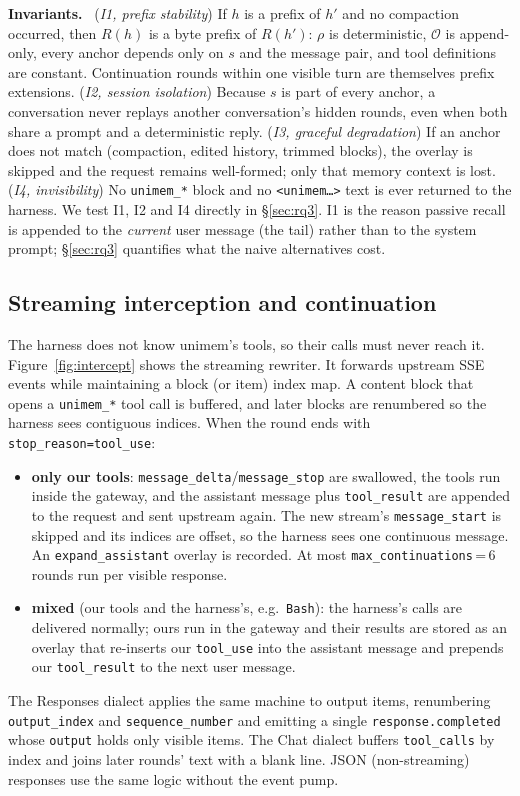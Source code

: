 \documentclass[10pt,twocolumn]{article}
\newcommand{\sys}{\textsf{unimem}}
\newcommand{\code}[1]{\texttt{\small #1}}
\newcommand{\para}[1]{\smallskip\noindent\textbf{#1}\ }
\begin{document}
\para{Invariants.}
(\emph{I1, prefix stability}) If $h$ is a prefix of $h'$ and no compaction occurred, then $R(h)$ is a byte prefix of
$R(h')$: $\rho$ is deterministic, $\mathcal{O}$ is append-only, every anchor depends only on $s$ and the message pair,
and tool definitions are constant. Continuation rounds within one visible turn are themselves prefix extensions.
(\emph{I2, session isolation}) Because $s$ is part of every anchor, a conversation never replays another
conversation's hidden rounds, even when both share a prompt and a deterministic reply.
(\emph{I3, graceful degradation}) If an anchor does not match (compaction, edited history, trimmed blocks), the overlay
is skipped and the request remains well-formed; only that memory context is lost.
(\emph{I4, invisibility}) No \code{unimem\_*} block and no \code{<unimem\ldots>} text is ever returned to the harness.
We test I1, I2 and I4 directly in \S\ref{sec:rq3}. I1 is the reason passive recall is appended to the \emph{current}
user message (the tail) rather than to the system prompt; \S\ref{sec:rq3} quantifies what the naive alternatives cost.

\subsection{Streaming interception and continuation}
\label{sec:intercept}

The harness does not know \sys{}'s tools, so their calls must never reach it. Figure~\ref{fig:intercept} shows the
streaming rewriter. It forwards upstream SSE events while maintaining a block (or item) index map. A content block
that opens a \code{unimem\_*} tool call is buffered, and later blocks are renumbered so the harness sees contiguous
indices. When the round ends with \code{stop\_reason=tool\_use}:
\begin{itemize}
\item \textbf{only our tools}: \code{message\_delta}/\code{message\_stop} are swallowed, the tools run inside the
  gateway, and the assistant message plus \code{tool\_result} are appended to the request and sent upstream again. The
  new stream's \code{message\_start} is skipped and its indices are offset, so the harness sees one continuous
  message. An \code{expand\_assistant} overlay is recorded. At most \code{max\_continuations}\,=\,6 rounds run per
  visible response.
\item \textbf{mixed} (our tools and the harness's, e.g.\ \code{Bash}): the harness's calls are delivered normally; ours
  run in the gateway and their results are stored as an overlay that re-inserts our \code{tool\_use} into the assistant
  message and prepends our \code{tool\_result} to the next user message.
\end{itemize}
The Responses dialect applies the same machine to output items, renumbering \code{output\_index} and
\code{sequence\_number} and emitting a single \code{response.completed} whose \code{output} holds only visible items. The
Chat dialect buffers \code{tool\_calls} by index and joins later rounds' text with a blank line. JSON
(non-streaming) responses use the same logic without the event pump.
\end{document}
